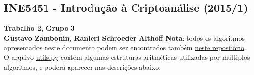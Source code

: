 \documentclass{article}
\begin{document}
\begin{center}
    \section*{INE5451 - Introdução à Criptoanálise (2015/1)}
    \textbf{Trabalho 2, Grupo 3 \\
    Gustavo Zambonin, Ranieri Schroeder Althoff\break}
\newline
\textbf{Nota}: todos os algoritmos apresentados neste documento podem ser encontrados também \href{https://github.com/zambonin/ufsc-ine5451}{neste repositório}. \break O arquivo \href{https://raw.githubusercontent.com/zambonin/UFSC-INE5451/master/T2/utils.py}{utils.py} contém algumas estruturas aritméticas utilizadas por múltiplos algoritmos, e poderá aparecer nas descrições abaixo.
\end{center}
\end{document}

